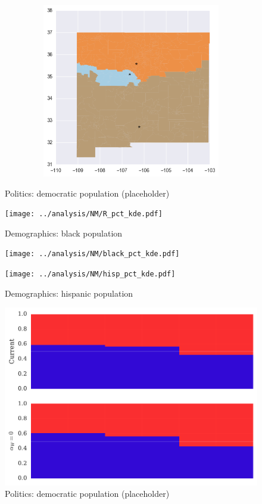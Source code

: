 \begin{figure}[htb!]
\includegraphics[width=5in,height=3in,keepaspectratio]{../maps/NM/static/0_25_after.png}
\end{figure}

\clearpage
\newpage

\begin{figure}[htb!] \centering
\caption{ Politics: democratic population (placeholder)}
\texttt{[image: ../analysis/NM/R\_pct\_kde.pdf]}
\caption{ Demographics: black population }
\texttt{[image: ../analysis/NM/black\_pct\_kde.pdf]}
\caption{ Demographics: hispanic population }
\texttt{[image: ../analysis/NM/hisp\_pct\_kde.pdf]}
\end{figure}

\clearpage
\newpage

\begin{figure}[htb!] \centering
\caption{ Politics: democratic population (placeholder)}
\includegraphics[width=6in]{../analysis/NM/barplot.pdf}
\end{figure}

\clearpage
\newpage

